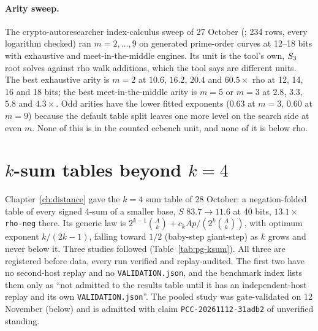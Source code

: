\paragraph{Arity sweep.} The crypto-autoresearcher index-calculus sweep of
27 October (; 234 rows, every
logarithm checked) ran $m=2,\dots,9$ on generated prime-order curves at
12--18 bits with exhaustive and meet-in-the-middle engines. Its unit is the
tool's own, $S_{3}$ root solves against rho walk additions, which the
tool says are different units. The best exhaustive arity is $m=2$ at
$10.6$, $16.2$, $20.4$ and $60.5\times$ rho at 12, 14, 16 and 18 bits; the
best meet-in-the-middle arity is $m=5$ or $m=3$ at $2.8$, $3.3$, $5.8$ and
$4.3\times$. Odd arities have the lower fitted exponents ($0.63$ at $m=3$,
$0.60$ at $m=9$) because the default table split leaves one more level on
the search side at even $m$. None of this is in the counted ecbench unit,
and none of it is below rho.

\section{$k$-sum tables beyond $k=4$}\label{sec:pg-ksum}

Chapter~\ref{ch:distance} gave the $k=4$ sum table of 28 October: a
negation-folded table of every signed 4-sum of a smaller base, $S$ $83.7\to
11.6$ at 40 bits, $13.1\times$ \texttt{rho-neg} there. Its generic law is
$2^{k-1}\binom{A}{k}+c_k A p/(2^k\binom Ak)$, with optimum exponent
$k/(2k-1)$, falling toward $1/2$ (baby-step giant-step) as $k$ grows and
never below it. Three studies followed (Table~\ref{tab:pg-ksum}). All three
are registered before data, every run verified and replay-audited. The
first two have no second-host replay and no \texttt{VALIDATION.json}, and
the benchmark index lists them only as ``not admitted to the results table
until it has an independent-host replay and its own
\texttt{VALIDATION.json}''. The pooled study was gate-validated on 12
November (below) and is admitted with claim \texttt{PCC-20261112-31adb2}
of unverified standing.

